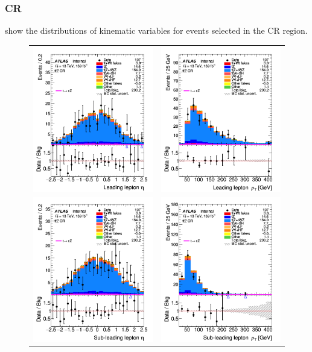 \clearpage
\FloatBarrier
\subsubsection{\ttZ CR}
 show the distributions 
of kinematic variables for events selected in the \ttZ CR region.

\begin{figure}[!htbp]
	\centering
	\begin{tabular}{cc}
		\includegraphics[width=.32\textwidth]{Chapters/CH7/figures/TTZCR/lep1_eta} &
		\includegraphics[width=.32\textwidth]{Chapters/CH7/figures/TTZCR/lep1_pt} \\
		\includegraphics[width=.32\textwidth]{Chapters/CH7/figures/TTZCR/lep2_eta} &
		\includegraphics[width=.32\textwidth]{Chapters/CH7/figures/TTZCR/lep2_pt} \\

\end{tabular}
\end{figure}
